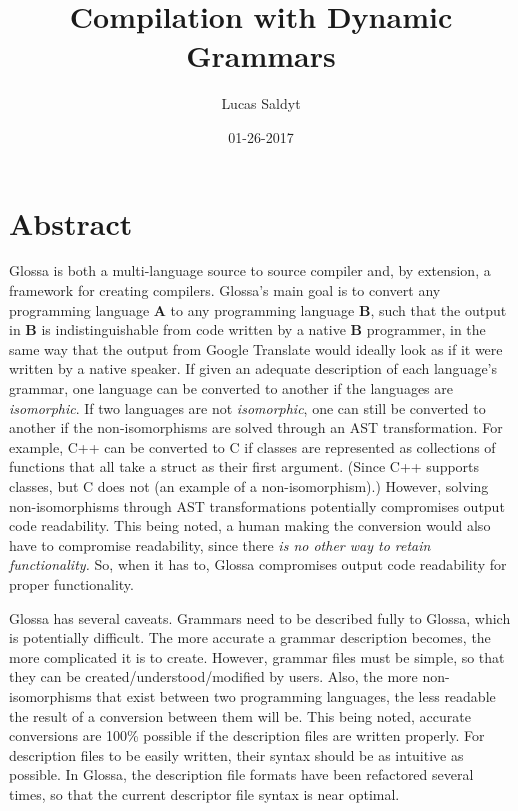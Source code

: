 \documentclass{article}
\title{Compilation with Dynamic Grammars}
\date{01-26-2017}
\author{Lucas Saldyt}
\begin{document}
\maketitle
{}
\newpage
{}

\section{Abstract}
Glossa is both a multi-language source to source compiler and, by extension, a framework for creating compilers.
Glossa's main goal is to convert any programming language \textbf{A} to any programming language \textbf{B}, such that the output in \textbf{B} is indistinguishable from code written by a native \textbf{B} programmer, in the same way that the output from Google Translate would ideally look as if it were written by a native speaker.
If given an adequate description of each language's grammar, one language can be converted to another if the languages are \textit{isomorphic}.
If two languages are not \textit{isomorphic}, one can still be converted to another if the non-isomorphisms are solved through an AST transformation.
For example, C++ can be converted to C if classes are represented as collections of functions that all take a struct as their first argument. (Since C++ supports classes, but C does not (an example of a non-isomorphism).)
However, solving non-isomorphisms through AST transformations potentially compromises output code readability. This being noted, a human making the conversion would also have to compromise readability, since there \textit{is no other way to retain functionality.} So, when it has to, Glossa compromises output code readability for proper functionality.

Glossa has several caveats. 
Grammars need to be described fully to Glossa, which is potentially difficult.
The more accurate a grammar description becomes, the more complicated it is to create.
However, grammar files must be simple, so that they can be created/understood/modified by users.
Also, the more non-isomorphisms that exist between two programming languages, the less readable the result of a conversion between them will be.
This being noted, accurate conversions are 100\% possible if the description files are written properly.
For description files to be easily written, their syntax should be as intuitive as possible. 
In Glossa, the description file formats have been refactored several times, so that the current descriptor file syntax is near optimal.
\end{document}
